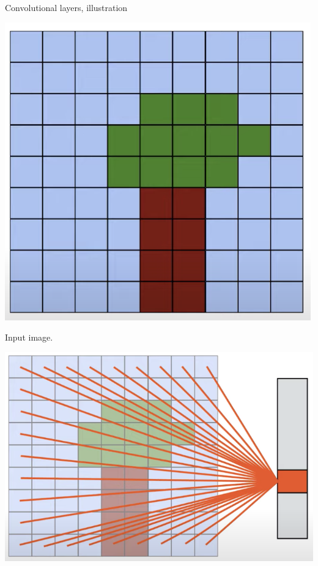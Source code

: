 \begin{frame}{Convolutional layers, illustration}
\begin{minipage}{0.2\linewidth}
  \begin{center}
    \includegraphics[height=0.35\textheight]{figures/image-tree.png}
  \end{center}
Input image.
\end{minipage}
\hspace{2mm}
\begin{minipage}{0.35\linewidth}
  \begin{center}
    \includegraphics[height=0.35\textheight]{figures/fc-net.png}

\end{center}
\end{minipage}
\end{frame}
